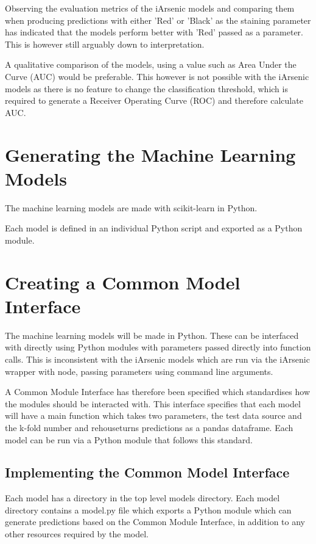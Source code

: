 Observing the evaluation metrics of the iArsenic models and comparing them when producing predictions with either 'Red' or 'Black' as the staining parameter has indicated that the models perform better with 'Red' passed as a parameter. This is however still arguably down to interpretation.

A qualitative comparison of the models, using a value such as Area Under the Curve (AUC) would be preferable. This however is not possible with the iArsenic models as there is no feature to change the classification threshold, which is required to generate a Receiver Operating Curve (ROC) and therefore calculate AUC.

\section{Generating the Machine Learning Models}

The machine learning models are made with scikit-learn in Python. 

Each model is defined in an individual Python script and exported as a Python module.

\section{Creating a Common Model Interface}

The machine learning models will be made in Python. These can be interfaced with directly using Python modules with parameters passed directly into function calls. This is inconsistent with the iArsenic models which are run via the iArsenic wrapper with node, passing parameters using command line arguments.

A Common Module Interface has therefore been specified which standardises how the modules should be interacted with. This interface specifies that each model will have a main function which takes two parameters, the test data source and the k-fold number and rehouseturns predictions as a pandas dataframe. Each model can be run via a Python module that follows this standard.

\subsection{Implementing the Common Model Interface}

Each model has a directory in the top level models directory. Each model directory contains a model.py file which exports a Python module which can generate predictions based on the Common Module Interface, in addition to any other resources required by the model.

